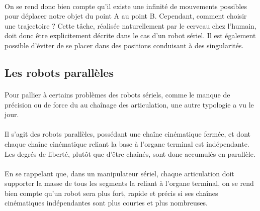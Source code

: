 \documentclass[a4paper,10pt]{article}
\begin{document}
                \paragraph{}
                    On se rend donc bien compte qu'il existe une infinité de mouvements possibles 
                    pour déplacer notre objet du point A au point B. 
                    Cependant, comment choisir une trajectoire ? 
                    Cette tâche, réalisée naturellement par le cerveau 
                    chez l'humain, doit donc être explicitement décrite dans le cas d'un robot sériel. 
                    Il est également possible d'éviter de se placer dans des positions conduisant à 
                    des singularités. 
                
        \subsection{Les robots parallèles}
            \paragraph{}
                Pour pallier à certains problèmes des robots sériels, comme le manque de 
                précision ou de force du au chaînage des articulation, une autre typologie
                a vu le jour. 
                
            \paragraph{}
                Il s'agit des robots parallèles, possédant une chaîne cinématique fermée, 
                et dont chaque chaîne cinématique reliant la base à l'organe terminal 
                est indépendante. Les degrés de liberté, plutôt que d'être chaînés, sont
                donc accumulés en parallèle. 
                
            \paragraph{}
                En se rappelant que, dans un manipulateur sériel, chaque articulation
                doit supporter la masse de tous les segments la reliant à l'organe terminal, 
                on se rend bien compte qu'un robot sera plus fort, rapide et précis si
                ses chaînes cinématiques indépendantes sont plus courtes et plus nombreuses. 
                
\end{document}
